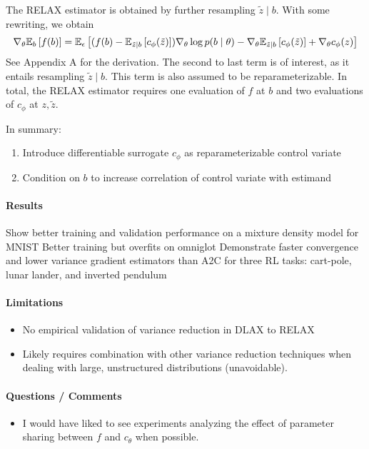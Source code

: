 The RELAX estimator is obtained by further resampling $\tilde{z}\mid b$.
With some rewriting, we obtain
\begin{equation}
\nabla_\theta \mathbb{E}_{b}\left[f(b)\right]
= \mathbb{E}_{\epsilon}\left[(f(b) - \mathbb{E}_{\tilde{z}\mid b}\left[c_\phi(\tilde{z})\right])\nabla_\theta \log p(b\mid\theta)
- \nabla_\theta\mathbb{E}_{\tilde{z}\mid b}\left[ c_\phi(\tilde{z})\right] + \nabla_\theta c_\phi(z)\right]
\end{equation}
See Appendix A for the derivation.
The second to last term is of interest, as it entails resampling $\tilde{z} \mid b$.
This term is also assumed to be reparameterizable.
In total, the RELAX estimator requires one evaluation of $f$
at $b$ and two evaluations of $c_\phi$ at $z,\tilde{z}$.

In summary:
\begin{enumerate}
\item Introduce differentiable surrogate $c_\phi$ as reparameterizable control variate 
\item Condition on $b$ to increase correlation of control variate with estimand
\end{enumerate}

\paragraph{Results}
Show better training and validation performance on a mixture density model for MNIST
Better training but overfits on omniglot
Demonstrate faster convergence and lower variance gradient estimators than
A2C for three RL tasks: cart-pole, lunar lander, and inverted pendulum

\paragraph{Limitations}
\begin{itemize}
\item No empirical validation of variance reduction in DLAX to RELAX
\item Likely requires combination with other variance reduction techniques when dealing with
    large, unstructured distributions (unavoidable).
\end{itemize}

\paragraph{Questions / Comments}
\begin{itemize}
\item I would have liked to see experiments analyzing the effect of parameter sharing between
$f$ and $c_\theta$ when possible.
\end{itemize}

